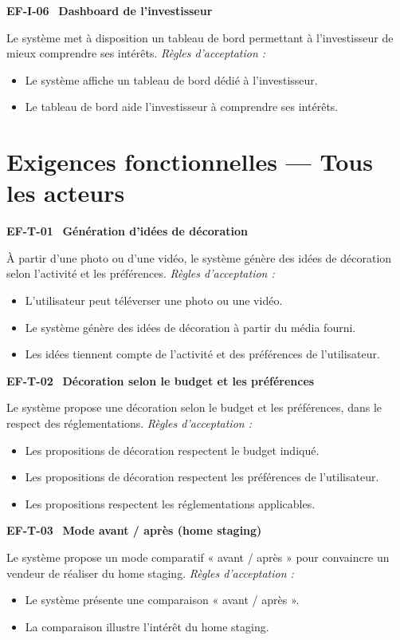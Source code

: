\documentclass[11pt,a4paper]{article}
\newcommand{\exigence}[2]{%
  \par\vspace{6pt}%
  \noindent\colorbox{light}{%
    \parbox{\dimexpr\textwidth-2\fboxsep}{%
      \textbf{\color{primary}#1} \textemdash\ \textbf{#2}%
    }%
  }\par\vspace{2pt}%
}
\newenvironment{acceptation}
  {\vspace{2pt}\noindent\textit{Règles d'acceptation :}
   \begin{itemize}[leftmargin=1.4em,itemsep=1pt,topsep=2pt]}
  {\end{itemize}\vspace{4pt}}
\begin{document}
\exigence{EF-I-06}{Dashboard de l'investisseur}
Le système met à disposition un tableau de bord permettant à l'investisseur
de mieux comprendre ses intérêts.
\begin{acceptation}
  \item Le système affiche un tableau de bord dédié à l'investisseur.
  \item Le tableau de bord aide l'investisseur à comprendre ses intérêts.
\end{acceptation}

\clearpage

\section{Exigences fonctionnelles — Tous les acteurs}

\exigence{EF-T-01}{Génération d'idées de décoration}
À partir d'une photo ou d'une vidéo, le système génère des idées de
décoration selon l'activité et les préférences.
\begin{acceptation}
  \item L'utilisateur peut téléverser une photo ou une vidéo.
  \item Le système génère des idées de décoration à partir du média fourni.
  \item Les idées tiennent compte de l'activité et des préférences de l'utilisateur.
\end{acceptation}

\exigence{EF-T-02}{Décoration selon le budget et les préférences}
Le système propose une décoration selon le budget et les préférences, dans le
respect des réglementations.
\begin{acceptation}
  \item Les propositions de décoration respectent le budget indiqué.
  \item Les propositions de décoration respectent les préférences de l'utilisateur.
  \item Les propositions respectent les réglementations applicables.
\end{acceptation}

\exigence{EF-T-03}{Mode avant / après (home staging)}
Le système propose un mode comparatif « avant / après » pour convaincre un
vendeur de réaliser du home staging.
\begin{acceptation}
  \item Le système présente une comparaison « avant / après ».
  \item La comparaison illustre l'intérêt du home staging.
\end{acceptation}
\end{document}
